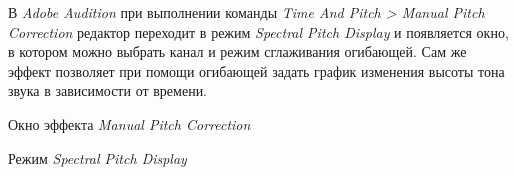 \documentclass{beamer}
\begin{document}
\begin{frame}
  В \emph{Adobe Audition} при выполнении команды \textit{Time And Pitch > Manual Pitch Correction} редактор переходит в режим \emph{Spectral Pitch Display} и появляется окно, в котором можно выбрать канал и режим сглаживания огибающей. Сам же эффект позволяет при помощи огибающей задать график изменения высоты тона звука в зависимости от времени.

  \begin{block}{Окно эффекта \emph{Manual Pitch Correction}}
  \end{block}
\end{frame}

\begin{frame}
  \begin{block}{Режим \emph{Spectral Pitch Display}}
  \end{block}
\end{frame}
\end{document}
